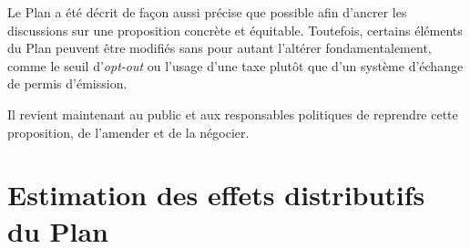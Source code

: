 \documentclass[a5paper,french]{memoir}
\begin{document}
Le Plan a été décrit de façon aussi précise que possible afin d'ancrer les discussions sur une proposition concrète et équitable. Toutefois, certains éléments du Plan peuvent être modifiés sans pour autant l'altérer fondamentalement, comme le seuil d'\textit{opt-out} ou l'usage d'une taxe plutôt que d'un système d'échange de permis d'émission. 

Il revient maintenant au public et aux responsables politiques de reprendre cette proposition, de l'amender et de la négocier.


\chapter{Estimation des effets distributifs du Plan
}\label{ch:methodo}


\renewcommand{\url}[1]{\href{#1}{Link}} %


\listoftables
\listoffigures
\end{document}
